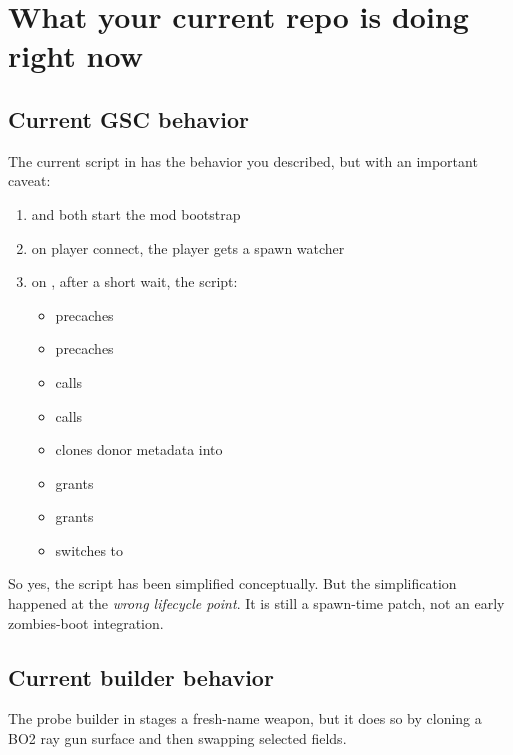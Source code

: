 \documentclass[11pt]{article}
\begin{document}
\section{What your current repo is doing right now}

\subsection{Current GSC behavior}

The current script in  has the behavior you described, but with an important caveat:

\begin{enumerate}
  \item {} and  both start the mod bootstrap
  \item on player connect, the player gets a spawn watcher
  \item on , after a short wait, the script:
  \begin{itemize}
    \item precaches 
    \item precaches 
    \item calls 
    \item calls 
    \item clones donor metadata into 
    \item grants 
    \item grants 
    \item switches to 
  \end{itemize}
\end{enumerate}

So yes, the script has been simplified conceptually. But the simplification happened at the \emph{wrong lifecycle point}. It is still a spawn-time patch, not an early zombies-boot integration.

\subsection{Current builder behavior}

The probe builder in  stages a fresh-name weapon, but it does so by cloning a BO2 ray gun surface and then swapping selected fields.
\end{document}
